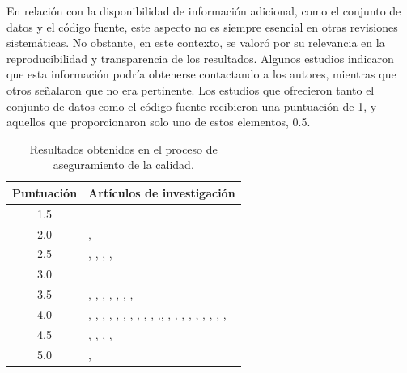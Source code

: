 En relación con la disponibilidad de información adicional, como el conjunto de datos y el código fuente, este aspecto no es siempre esencial en otras revisiones sistemáticas. No obstante, en este contexto, se valoró por su relevancia en la reproducibilidad y transparencia de los resultados. Algunos estudios indicaron que esta información podría obtenerse contactando a los autores, mientras que otros señalaron que no era pertinente. Los estudios que ofrecieron tanto el conjunto de datos como el código fuente recibieron una puntuación de 1, y aquellos que proporcionaron solo uno de estos elementos, 0.5.

\begin{table}[H]
\small
\caption{Resultados obtenidos en el proceso de aseguramiento de la calidad.}
\begin{tabularx}{\textwidth}{cX}
\hline
\textbf{Puntuación} & \textbf{Artículos de investigación}\\
\hline
1.5 & \cite{10.1109/multi-temp.2017.8035233} \\ \hline
2.0 & \cite{ayma2019mapping}, \cite{10.5194/isprs-annals-v-3-2020-417-2020} \\ \hline
2.5 & \cite{fang2017discriminative}, \cite{thanki2019glacier}, \cite{yan2020automatic}, \cite{ambinakudige2022estimation}, \cite{shukla2022super} \\ \hline
3.0 & \cite{wang2020glacier} \\ \hline
3.5 & \cite{alifu2020machine}, \cite{khan2020machine}, \cite{haq2021snow}, \cite{florath2022glacier}, \cite{lin2022accurate}, \cite{roberts2022changes}, \cite{tian2022mapping}, \cite{su142013485} \\ \hline
4.0 & \cite{nijhawan2018hybrid}, \cite{patel2019mapping}, \cite{zhang2019glacier}, \cite{robson2020automated}, \cite{he2020glacier}, \cite{lu2020glacier}, \cite{marcer2020rock}, \cite{xie2020glaciernet}, \cite{xie2020upward}, \cite{lu2021novel}, \cite{pandey2021integrated},\cite{yan2021glacier}, \cite{barella2022combined}, \cite{hu2022new}, \cite{khan2022deep}, \cite{panwar2022classification}, \cite{sharda2022hybrid}, \cite{xie2022glaciernet2}, \cite{xie2022progressive}, \cite{yao2022potential}, \cite{xiao2023glacier}, \cite{yang2023delineation} \\ \hline
4.5 & \cite{chen2022long}, \cite{chu2022glacier}, \cite{erharter2022machine}, \cite{aryal2023boundary}, \cite{thomas2023integrated} \\ \hline
5.0 & \cite{baraka2020machine}, \cite{hu2022mapping} \\
\hline
\end{tabularx}
\label{tab:AseguramientoCalidadResultado}
\end{table}

